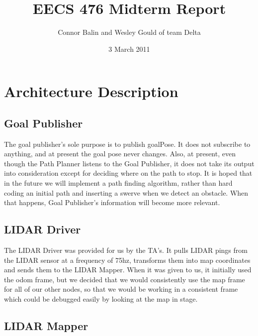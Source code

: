 \documentclass{article}
\author{Connor Balin and Wesley Gould of team Delta}
\title{EECS 476 Midterm Report}
\date{3 March 2011}
\begin{document}
\maketitle

\small
\section{Architecture Description}

\lstset{language=C++}
\subsection{Goal Publisher}

The goal publisher's sole purpose is to publish goalPose.
It does not subscribe to anything, and at present the goal pose never changes.
Also, at present, even though the Path Planner listens to the Goal Publisher, it does not take its output into consideration except for deciding where on the path to stop.
It is hoped that in the future we will implement a path finding algorithm, rather than hard coding an initial path and inserting a swerve when we detect an obstacle.
When that happens, Goal Publisher's information will become more relevant.



\subsection{LIDAR Driver}

The LIDAR Driver was provided for us by the TA's.
It pulls LIDAR pings from the LIDAR sensor at a frequency of 75hz, transforms them into map coordinates and sends them to the LIDAR Mapper.
When it was given to us, it initially used the odom frame, but we decided that we would consistently use the map frame for all of our other nodes, so that we would be working in a consistent frame which could be debugged easily by looking at the map in stage.



\subsection{LIDAR Mapper}
\end{document}

